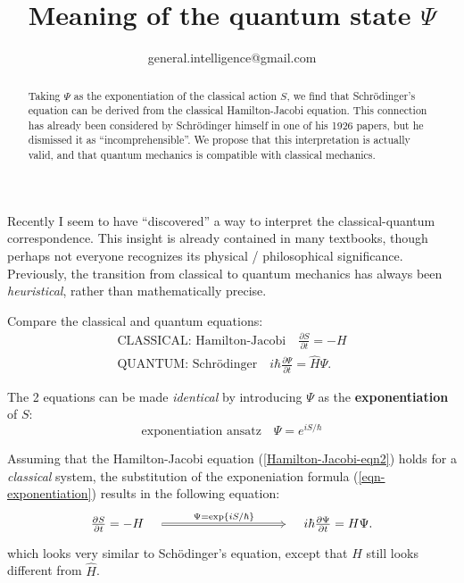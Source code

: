 

\title{Meaning of the quantum state $\Psi$}
\author{ {\footnotesize general.intelligence@gmail.com}}



	\setlength{\parindent}{0pt}
	\setlength{\parskip}{2.8ex plus0.8ex minus0.8ex}
	
	\maketitle
	
\begin{abstract}
	Taking $\Psi$ as the exponentiation of the classical action $S$, we find that Schr\"odinger's equation can be derived from the classical Hamilton-Jacobi equation.  This connection has already been considered by Schr\"odinger himself in one of his 1926 papers, but he dismissed it as ``incomprehensible''.  We propose that this interpretation is actually valid, and that quantum mechanics is compatible with classical mechanics.
\end{abstract}

Recently I seem to have ``discovered'' a way to interpret the classical-quantum correspondence.  This insight is already contained in many textbooks, though perhaps not everyone recognizes its physical / philosophical significance.  Previously, the transition from classical to quantum mechanics has always been \textit{heuristical}, rather than mathematically precise.

Compare the classical and quantum equations:
\begin{eqnarray}
\boxed{\mbox{CLASSICAL: Hamilton-Jacobi}} \quad
\frac{\partial S}{\partial t} = - H
\label{Hamilton-Jacobi-eqn2}
\\
\boxed{\mbox{QUANTUM: Schr\"{o}dinger}} \quad
i \hbar \frac{\partial \Psi}{\partial t} = \hat{H} \Psi .
\label{Schrodinger-eqn}
\end{eqnarray}

The 2 equations can be made \textit{identical} by introducing $\Psi$ as the \textbf{exponentiation} of $S$:
\begin{equation}
\boxed{\mbox{exponentiation ansatz}} \quad
\Psi = e^{i S /\hbar}
\label{eqn-exponentiation}
\end{equation}

Assuming that the Hamilton-Jacobi equation (\ref{Hamilton-Jacobi-eqn2}) holds for a \textit{classical} system, the substitution of the exponeniation formula (\ref{eqn-exponentiation}) results in the following equation:
\begin{equation}
\begin{tikzcd}[column sep = 10em]
\frac{\partial S}{\partial t} = - H \quad
\arrow[Rightarrow, r, "$\Psi = \exp \{ i S / \hbar \} $", align=center]
& \quad i \hbar \frac{\partial \Psi}{\partial t} = H \Psi .
\end{tikzcd}
\end{equation} 
which looks very similar to Sch\"odinger's equation, except that $H$ still looks different from $\hat{H}$.

